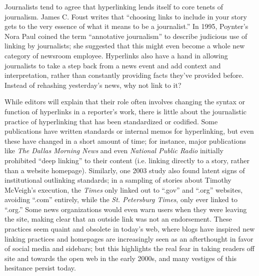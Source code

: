 Journalists tend to agree that hyperlinking lends itself to core tenets of journalism. James C. Foust writes that ``choosing links to include in your story gets to the very essence of what it means to be a journalist.''\autocite[161]{foust_online_2009} In 1995, Poynter's Nora Paul coined the term ``annotative journalism'' to describe judicious use of linking by journalists; she suggested that this might even become a whole new category of newsroom employee.\autocite{paul_content:_1995} Hyperlinks also have a hand in allowing journalists to take a step back from a news event and add context and interpretation, rather than constantly providing facts they've provided before. Instead of rehashing yesterday's news, why not link to it?

While editors will explain that their role often involves changing the syntax or function of hyperlinks in a reporter's work, there is little about the journalistic practice of hyperlinking that has been standardized or codified. Some publications have written standards or internal memos for hyperlinking, but even these have changed in a short amount of time; for instance, major publications like \emph{The Dallas Morning News} and even \emph{National Public Radio} initially prohibited ``deep linking'' to their content (i.e. linking directly to a story, rather than a website homepage).\autocite[49]{li_applying_2013} Similarly, one 2003 study also found latent signs of institutional outlinking standards; in a sampling of stories about Timothy McVeigh's execution, the \emph{Times} only linked out to  ``.gov'' and ``.org'' websites, avoiding ``.com'' entirely, while the \emph{St. Petersburg Times}, only ever linked to ``.org.''\autocite[410]{dimitrova_hyperlinking_2003} Some news organizations would even warn users when they were leaving the site, making clear that an outside link was not an endorsement. These practices seem quaint and obsolete in today's web, where blogs have inspired new linking practices and homepages are increasingly seen as an afterthought in favor of social media and sidebars; but this highlights the real fear in taking readers off site and towards the open web in the early 2000s, and many vestiges of this hesitance persist today.

